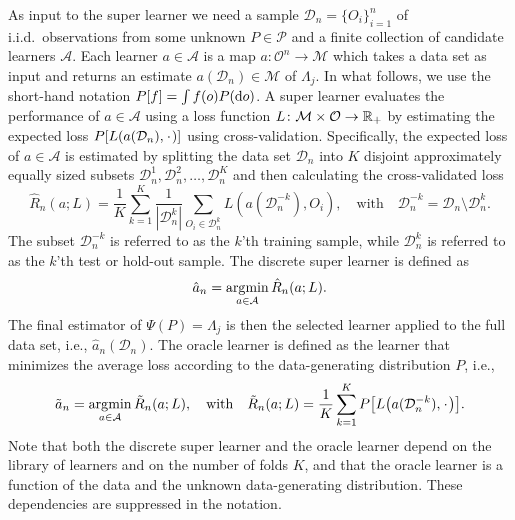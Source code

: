 \documentclass[a4,danish]{article}
\newcommand{\data}{\ensuremath{\mathcal{D}}}
\begin{document}
As input to the super learner we need a sample \( \data_n=\{O_i\}_{i=1}^n \) of
i.i.d.\ observations from some unknown \( P \in \mathcal{P} \) and a finite
collection of candidate learners $\mathcal{A}$. Each learner
\(a \in \mathcal{A}\) is a map
\( a \colon \mathcal{O}^n \rightarrow \mathcal{M}\) which takes a data set as
input and returns an estimate $a(\data_n) \in \mathcal{M}$ of $\Lambda_{j}$.
In what follows, we use the short-hand notation
\(P[f] = \int f(o) P(\mathop{}\!\mathrm{d} o) \). A super learner evaluates the
performance of \(a \in \mathcal{A}\) using a loss function
\(L\colon \mathcal{M} \times \mathcal{O} \rightarrow \mathbb{R}_+\) by
estimating the expected loss \(P[L(a(\data_n), \blank)]\) using
cross-validation. Specifically, the expected loss of $a\in\mathcal A$
is estimated by splitting the data set $\data_n$ into $K$ disjoint
approximately equally sized subsets
\(\data_n^1, \data_n^2, \dots, \data_n^K \) and then calculating the
cross-validated loss
\begin{equation*}
  \hat{R}_n(a; L) =
  \frac{1}{K}\sum_{k=1}^{K}
  \frac{1}{| \data_n^{k} |}\sum_{O_i \in \data_n^{k}}
  L
  {
    \left(
      a{ (\data_n^{-k})}
      , O_i
    \right)
  },
  \quad \text{with} \quad
  \data_n^{-k} = \data_n \setminus \data_n^{k}.
\end{equation*}
The subset \(\data_n^{-k}\) is referred to as the \(k\)'th training
sample, while \(\data_n^{k}\) is referred to as the \(k\)'th test or
hold-out sample.
The discrete super learner is defined as
\begin{equation*}
\hat{a}_n = \operatorname*{\arg\!\min}_{a\in\mathcal A}\hat{R}_n(a; L).
\end{equation*}
The final estimator of \(\Psi(P)=\Lambda_j\) is then the selected
learner applied to the full data set, i.e., \(\hat{a}_n(\data_n)\).
The oracle learner is defined as the learner that minimizes the
average loss according to the data-generating distribution \( P \),
i.e.,
\begin{equation*}
  \tilde{a}_n =
  \argmin_{a \in \mathcal{A}}
  \tilde{R}_n(a; L),
  \quad \text{with} \quad 
  \tilde{R}_n(a; L)=
  \frac{1}{K}\sum_{k=1}^{K} 
  P{
    \left[
      L
      {
        \left(
          a{ (\data_n^{-k})}
          , \blank
        \right)
      }
    \right]}
  .
\end{equation*}
Note that both the discrete super learner and the oracle learner depend on the
library of learners and on the number of folds \(K\), and that the oracle
learner is a function of the data and the unknown data-generating distribution.
These dependencies are suppressed in the notation.
\end{document}
